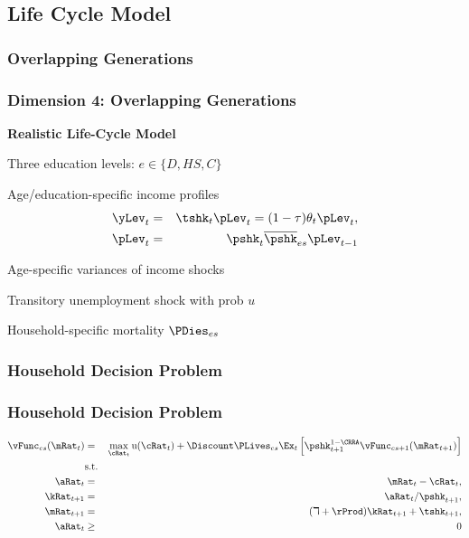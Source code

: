 \documentclass{beamer}
\newcommand{\jemph}[1]{{\color{jirkasred}#1}}
\renewcommand{\urate}{\ensuremath{u}}
\begin{document}
\subsection{Life Cycle Model}
\subsubsection{Overlapping Generations}
\begin{frame}
\frametitle{Dimension 4: Overlapping Generations}
\jemph{\textbf{Realistic Life-Cycle Model}}
\bi
\item Three education levels: $e\in\{D, HS, C\}$
\item Age/education-specific income profiles
\begin{eqnarray*}
\yLev_t &=& \tshk_t \pLev_t = (1 - \tau)\theta_t \pLev_t,\\
\pLev_t &=& \pshk_t \overline{\pshk}_{es} \pLev_{t-1}
\end{eqnarray*}
\bi
\item Age-specific variances of income shocks
\item Transitory unemployment shock with prob $\urate$
\ei
\item Household-specific mortality $\PDies_{es}$
\ei
\end{frame}

\subsubsection{Household Decision Problem}

\begin{frame}
\frametitle{Household Decision Problem}
\begin{eqnarray*}
\vFunc_{es}(\mRat_t) &=& \max_{\cRat_t} \uFunc(\cRat_t) + \Discount \PLives_{es} \Ex_t \left[\pshk_{t+1}^{1-\CRRA} \vFunc_{es+1}(\mRat_{t+1})\right]\\
\notag &\text{s.t.}&\\
\aRat_t &=& \mRat_t - \cRat_t,\\
\kRat_{t+1} &=& \aRat_t/\pshk_{t+1},\\
\mRat_{t+1} &=& (\daleth +\rProd) \kRat_{t+1} + \tshk_{t+1},\\
\aRat_t &\geq& 0
\end{eqnarray*}
\end{frame}
\end{document}

